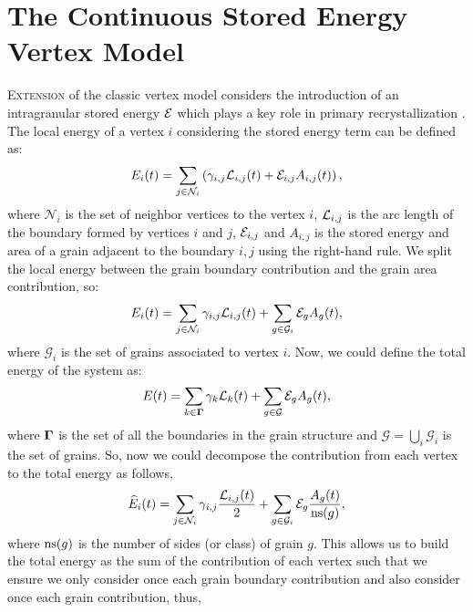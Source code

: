 \chapter{The Continuous Stored Energy Vertex Model}
\label{chap:storedenergy}

 \lettrine{E}{xtension} of the classic vertex model considers the introduction of an intragranular stored energy $\mathcal{E}$ which plays a key role in primary recrystallization \cite{pikekos2008generalized, pikekos2008stochastic}. The local energy of a vertex $i$ considering the stored energy term can be defined as:
 \begin{equation}
     E_i(t) = \sum_{j \in \mathcal{N}_i}\left(\gamma_{i,j}\mathcal{L}_{i,j}(t) + \mathcal{E}_{i,j}A_{i,j}(t)\right),
 \end{equation}
 where $\mathcal{N}_i$ is the set of neighbor vertices to the vertex $i$, $\mathcal{L}_{i,j}$ is the arc length of the boundary formed by vertices $i$ and $j$, $\mathcal{E}_{i,j}$ and $A_{i,j}$ is the stored energy and area of a grain adjacent to the boundary $i,j$ using the right-hand rule. We split the local energy between the grain boundary contribution and the grain area contribution, so:
 \begin{equation}
     E_i(t) = \sum_{j \in \mathcal{N}_i}\gamma_{i,j}\mathcal{L}_{i,j}(t) + \sum_{g \in \mathcal{G}_i} \mathcal{E}_{g}A_{g}(t),
 \end{equation}
 where $\mathcal{G}_i$ is the set of grains associated to vertex $i$. Now, we could define the total energy of the system as:
 \begin{equation}
     E(t) = \sum_{k \in \bm{\Gamma}}\gamma_{k}\mathcal{L}_{k}(t) + 
     \sum_{g \in \mathcal{G}} \mathcal{E}_{g}A_{g}(t),
     \label{eq:SEtotalenergy}
 \end{equation}
 where $\bm{\Gamma}$ is the set of all the boundaries in the grain structure
 and $\mathcal{G}=\bigcup_i \mathcal{G}_i$ is the set of grains.
 So, now we could decompose the contribution
 from each vertex to the total energy as follows,
 \begin{equation}
     \widehat{E}_i(t) = \sum_{j \in \mathcal{N}_i}\gamma_{i,j}\dfrac{\mathcal{L}_{i,j}(t)}{2} + \sum_{g \in \mathcal{G}_i} \mathcal{E}_{g}\dfrac{A_{g}(t)}{\operatorname{ns}(g)},
         \label{eq:SEvertexenergy}
 \end{equation}
 where $\operatorname{ns}(g)$ is the number of sides (or class) of grain $g$. 
 This allows us to build the total energy
 as the sum of the contribution of each vertex
 such that we ensure we only consider once
 each grain boundary contribution and also consider
 once each grain contribution, thus,
